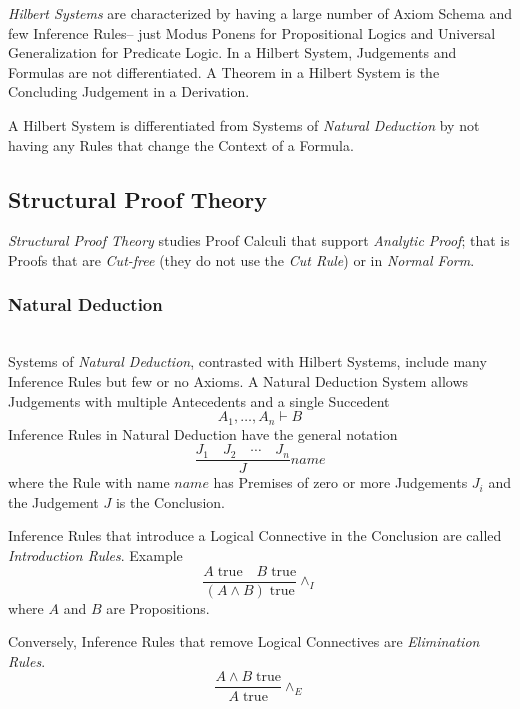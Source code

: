 \documentclass{article}
\begin{document}
\emph{Hilbert Systems} are characterized by having a large number of
Axiom Schema and few Inference Rules-- just Modus Ponens for
Propositional Logics and Universal Generalization for Predicate
Logic. In a Hilbert System, Judgements and Formulas are not
differentiated. A Theorem in a Hilbert System is the Concluding
Judgement in a Derivation.

A Hilbert System is differentiated from Systems of \emph{Natural
 Deduction} by not having any Rules that change the Context of a
Formula.

\subsection{Structural Proof Theory}

\emph{Structural Proof Theory} studies Proof Calculi that support
\emph{Analytic Proof}; that is Proofs that are \emph{Cut-free} (they
do not use the \emph{Cut Rule}) or in \emph{Normal Form}.

\subsubsection{Natural Deduction}\label{subsec:natural_deduction} \hfill
\\
Systems of \emph{Natural Deduction}\cite{prawitz65}, contrasted with
Hilbert Systems, include many Inference Rules but few or no Axioms. A
Natural Deduction System allows Judgements with multiple Antecedents
and a single Succedent
\[
    A_1,\ldots,A_n \vdash B
\]
Inference Rules in Natural Deduction have the general notation
\[
    {
        \frac{J_1 \quad J_2 \quad \cdots \quad J_n}
        {J}
    } name
\]
where the Rule with name $name$ has Premises of zero or more
Judgements $J_i$ and the Judgement $J$ is the Conclusion.

Inference Rules that introduce a Logical Connective in the Conclusion
are called \emph{Introduction Rules}. Example
\[
    {
        \frac{A\;\mathrm{true} \quad B\;\mathrm{true}}
        {(A \wedge B)\;\mathrm{true}}
    } \wedge_I
\]
where $A$ and $B$ are Propositions.

Conversely, Inference Rules that remove Logical Connectives are
\emph{Elimination Rules}.
\[
    {
        \frac{A \wedge B\;\mathrm{true}}
        {A\;\mathrm{true}}
    } \wedge_E
\]
\end{document}
